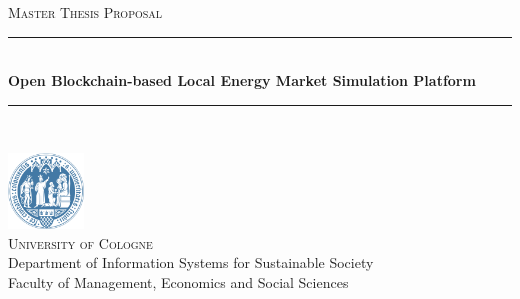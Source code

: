 \begin{titlepage}

    \newcommand{\HRule}{\rule{\linewidth}{0.1mm}} %

    \center %
	
   \textsc{\Large Master Thesis Proposal}\\[0.5cm] %
	    
    
    \HRule \\[0.4cm]
    { \huge \bfseries Open Blockchain-based Local Energy Market Simulation Platform}\\[0.7cm] %
    \HRule \\[0.4cm]
    
    \vspace{2cm}

    
    \includegraphics[width=0.15\textwidth]{img/uni_cologne.png}\\[1cm] %
    
   \textsc{\LARGE University of Cologne}\\[0.5cm] %
   
    \large
    Department of Information Systems for Sustainable Society\\
    Faculty of Management, Economics and Social Sciences\\
   
	\vspace{3cm}
	
    

\end{titlepage}
